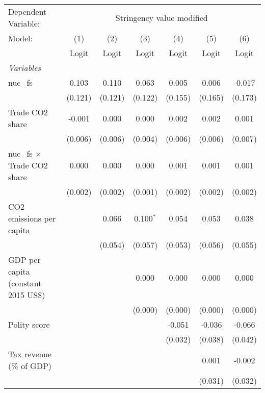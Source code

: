 
\begingroup
\centering
\begin{tabular}{lcccccc}
   \toprule
   Dependent Variable: & \multicolumn{6}{c}{Stringency value modified}\\
   Model:                               & (1)     & (2)     & (3)         & (4)     & (5)     & (6)\\  
                                        &  Logit  & Logit   & Logit       & Logit   & Logit   & Logit\\  
   \midrule
   \emph{Variables}\\
   nuc\_fs                              & 0.103   & 0.110   & 0.063       & 0.005   & 0.006   & -0.017\\   
                                        & (0.121) & (0.121) & (0.122)     & (0.155) & (0.165) & (0.173)\\   
   Trade CO2 share                      & -0.001  & 0.000   & 0.000       & 0.002   & 0.002   & 0.001\\   
                                        & (0.006) & (0.006) & (0.004)     & (0.006) & (0.006) & (0.007)\\   
   nuc\_fs $\times$ Trade CO2 share     & 0.000   & 0.000   & 0.000       & 0.001   & 0.001   & 0.001\\   
                                        & (0.002) & (0.002) & (0.001)     & (0.002) & (0.002) & (0.002)\\   
   CO2 emissions per capita             &         & 0.066   & 0.100$^{*}$ & 0.054   & 0.053   & 0.038\\   
                                        &         & (0.054) & (0.057)     & (0.053) & (0.056) & (0.055)\\   
   GDP per capita (constant 2015 US\$)  &         &         & 0.000       & 0.000   & 0.000   & 0.000\\   
                                        &         &         & (0.000)     & (0.000) & (0.000) & (0.000)\\   
   Polity score                         &         &         &             & -0.051  & -0.036  & -0.066\\   
                                        &         &         &             & (0.032) & (0.038) & (0.042)\\   
   Tax revenue (\% of GDP)              &         &         &             &         & 0.001   & -0.002\\   
                                        &         &         &             &         & (0.031) & (0.032)\\   

\end{tabular}
